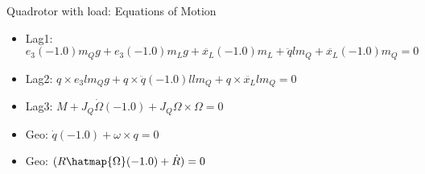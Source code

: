 Quadrotor with load: Equations of Motion
\begin{itemize}
\item Lag1: $e_3 (-1.0) m_Q g+e_3 (-1.0) m_L g+\ddot{x_L} (-1.0) m_L+\ddot{q} l m_Q+\ddot{x_L} (-1.0) m_Q = 0$
\item Lag2: $q\times e_3 l m_Q g+q\times \ddot{q} (-1.0) l l m_Q+q\times \ddot{x_L} l m_Q = 0$
\item Lag3: $M+J_Q \dot{\Omega } (-1.0)+J_Q \Omega \times \Omega  = 0$
\item Geo: $\dot{q} (-1.0)+\omega \times q = 0$
\item Geo: $(R \hatmap{\Omega } (-1.0)+\dot{R}) = 0$
\end{itemize}